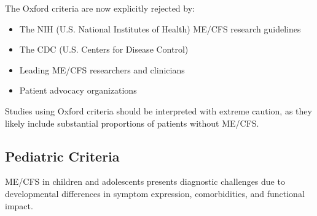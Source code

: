\begin{observation}
\label{obs:oxford-rejection}
The Oxford criteria are now explicitly rejected by:
\begin{itemize}
    \item The NIH (U.S. National Institutes of Health) ME/CFS research guidelines
    \item The CDC (U.S. Centers for Disease Control)
    \item Leading ME/CFS researchers and clinicians
    \item Patient advocacy organizations
\end{itemize}

Studies using Oxford criteria should be interpreted with extreme caution, as they likely include substantial proportions of patients without ME/CFS.
\end{observation}

\subsection{Pediatric Criteria}

ME/CFS in children and adolescents presents diagnostic challenges due to developmental differences in symptom expression, comorbidities, and functional impact.

